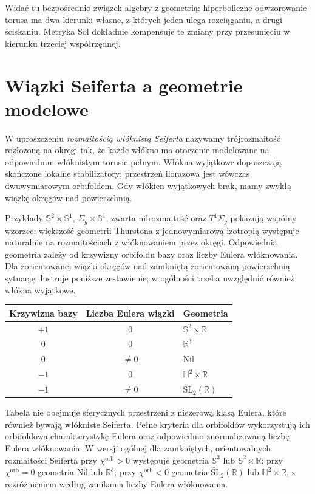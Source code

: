 Widać tu bezpośrednio związek algebry z geometrią: hiperboliczne
odwzorowanie torusa ma dwa kierunki własne, z których jeden ulega
rozciąganiu, a drugi ściskaniu. Metryka Sol dokładnie kompensuje te
zmiany przy przesunięciu w kierunku trzeciej współrzędnej.

\section{Wiązki Seiferta a geometrie modelowe}

\begin{definicja}
W uproszczeniu \emph{rozmaitością włóknistą Seiferta} nazywamy
trójrozmaitość rozłożoną na okręgi tak, że każde włókno ma
otoczenie modelowane na odpowiednim włóknistym torusie pełnym.
Włókna wyjątkowe dopuszczają skończone lokalne stabilizatory;
przestrzeń ilorazowa jest wówczas dwuwymiarowym orbifoldem.
Gdy włókien wyjątkowych brak, mamy zwykłą wiązkę okręgów nad
powierzchnią.
\end{definicja}

Przykłady $\mathbb S^2\times\mathbb S^1$,
$\Sigma_g\times\mathbb S^1$, zwarta nilrozmaitość oraz
$T^1\Sigma_g$ pokazują wspólny wzorzec: większość geometrii
Thurstona z jednowymiarową izotropią występuje naturalnie na
rozmaitościach z włóknowaniem przez okręgi.
Odpowiednia geometria zależy od krzywizny orbifoldu bazy
oraz liczby Eulera włóknowania. Dla zorientowanej wiązki
okręgów nad zamkniętą zorientowaną powierzchnią sytuację
ilustruje poniższe zestawienie; w ogólności trzeba uwzględnić
również włókna wyjątkowe.

\begin{center}
\begin{tabular}{|c|c|l|}
\hline
Krzywizna bazy & Liczba Eulera wiązki & Geometria \\
\hline
$+1$ & $0$ & $\mathbb S^2\times\mathbb R$ \\
$0$ & $0$ & $\mathbb R^3$ \\
$0$ & $\neq0$ & Nil \\
$-1$ & $0$ & $\mathbb H^2\times\mathbb R$ \\
$-1$ & $\neq0$ & $\widetilde{\mathrm{SL}}_2(\mathbb R)$ \\
\hline
\end{tabular}
\end{center}

Tabela nie obejmuje sferycznych przestrzeni z niezerową klasą
Eulera, które również bywają włókniste Seiferta. Pełne kryteria
dla orbifoldów wykorzystują ich orbifoldową charakterystykę
Eulera oraz odpowiednio znormalizowaną liczbę Eulera
włóknowania. W wersji ogólnej dla zamkniętych, orientowalnych
rozmaitości Seiferta przy $\chi^{\mathrm{orb}}>0$ występuje
geometria $\mathbb S^3$ lub $\mathbb S^2\times\mathbb R$;
przy $\chi^{\mathrm{orb}}=0$ geometria Nil lub $\mathbb R^3$;
przy $\chi^{\mathrm{orb}}<0$ geometria
$\widetilde{\mathrm{SL}}_2(\mathbb R)$ lub
$\mathbb H^2\times\mathbb R$, z rozróżnieniem według
zanikania liczby Eulera włóknowania.

